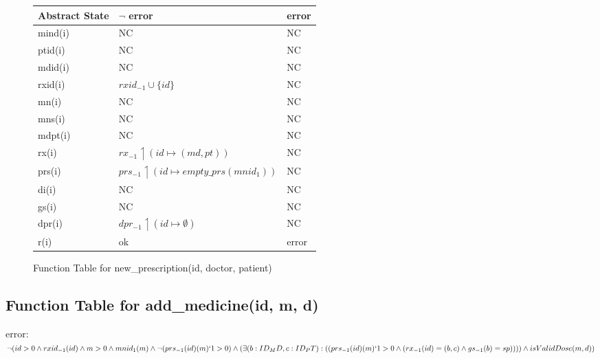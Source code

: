 \begin{figure}[h]
\begin{center}

\begin{tabular}{|l|l|l|}
\hline
Abstract State & $\neg$ error & error \\ \hline
mind(i)        &     NC      & NC    \\ \hline
ptid(i)        &       NC    & NC    \\ \hline
mdid(i)        &     NC      & NC    \\ \hline
rxid(i)        &     $rxid_{-1} \cup \{id\}$      & NC    \\ \hline
mn(i)          &      NC     & NC    \\ \hline
mns(i)         &     NC      & NC    \\ \hline
mdpt(i)        &    NC       & NC    \\ \hline
rx(i)          &      $rx_{-1} \upharpoonleft (id \mapsto (md, pt))$     & NC    \\ \hline
prs(i)         &      $prs_{-1} \upharpoonleft (id \mapsto empty\_prs(mnid_{1}))$      & NC    \\ \hline
di(i)          &        NC   & NC    \\ \hline
gs(i)          &       NC    & NC    \\ \hline
dpr(i)         &     $dpr_{-1} \upharpoonleft (id \mapsto \emptyset)$      & NC    \\ \hline
r(i)           & ok        & error \\ \hline
\end{tabular}

\caption{Function Table for new\_prescription(id, doctor, patient)}
\label{ft-np}
\end{center}
\end{figure}

\newpage

\subsection{Function Table for add\_medicine(id, m, d)}

error: $\neg (id > 0 \wedge rxid_{-1}(id) \wedge m > 0  \wedge mnid_{1}(m) \wedge \neg  (prs_{-1}(id)(m)`1 > 0) \wedge (\exists (b: ID_MD, c: ID_PT): ((prs_{-1}(id)(m)`1 > 0 \wedge (rx_{-1}(id) = (b,c) \wedge gs_{-1}(b) = sp )))) \wedge isValidDose(m,d))$

